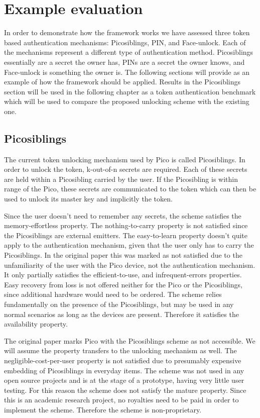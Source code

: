 \section{Example evaluation}
In order to demonstrate how the framework works we have assessed three token based authentication mechanisms: Picosiblings, PIN, and Face-unlock. Each of the mechanisms represent a different type of authentication method. Picosiblings essentially are a secret the owner has, PINs are a secret the owner knows, and Face-unlock is something the owner is. The following sections will provide as an example of how the framework should be applied. Results in the Picosiblings section will be used in the following chapter as a token authentication benchmark which will be used to compare the proposed unlocking scheme with the existing one.

	\subsection{Picosiblings}
	The current token unlocking mechanism used by Pico is called Picosiblings. In order to unlock the token, k-out-of-n secrets are required. Each of these secrets are held within a Picosibling carried by the user. If the Picosibling is within range of the Pico, these secrets are communicated to the token which can then be used to unlock its master key and implicitly the token.
	
	Since the user doesn't need to remember any secrets, the scheme satisfies the memory-effortless property. The nothing-to-carry property is not satisfied since the Picosiblings are external emitters. The easy-to-learn property doesn't quite apply to the authentication mechanism, given that the user only has to carry the Picosiblings. In the original paper this was marked as not satisfied due to the unfamiliarity of the user with the Pico device, not the authentication mechanism. It only partially satisfies the efficient-to-use, and infrequent-errors properties. Easy recovery from loss is not offered neither for the Pico or the Picosiblings, since additional hardware would need to be ordered. The scheme relies fundamentally on the presence of the Picosiblings, but may be used in any normal scenarios as long as the devices are present. Therefore it satisfies the availability property.
	
	The original paper marks Pico with the Picosiblings scheme as not accessible. We will assume the property transfers to the unlocking mechanism as well. The negligible-cost-per-user property is not satisfied due to presumably expensive embedding of Picosiblings in everyday items. The scheme was not used in any open source projects and is at the stage of a prototype, having very little user testing. For this reason the scheme does not satisfy the mature property. Since this is an academic research project, no royalties need to be paid in order to implement the scheme. Therefore the scheme is non-proprietary.
	
